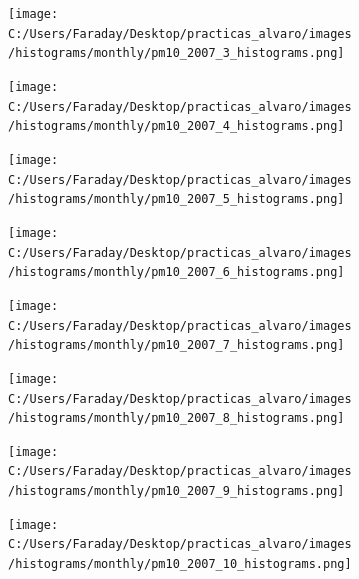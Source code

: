 \documentclass[12pt]{article}
\begin{document}
\begin{figure}[H]
\centering
\begin{subfigure}[h]{0.45\textwidth}
\texttt{[image: C:/Users/Faraday/Desktop/practicas\_alvaro/images/histograms/monthly/pm10\_2007\_3\_histograms.png]}
\caption{}
\label{fig:hist-mon-3-3-2007}
\end{subfigure}
%
\begin{subfigure}[H]{0.45\textwidth}
\texttt{[image: C:/Users/Faraday/Desktop/practicas\_alvaro/images/histograms/monthly/pm10\_2007\_4\_histograms.png]}
\caption{}
\label{fig:hist-mon-3-4-2007}
\end{subfigure}
\caption{}
\end{figure}

\begin{figure}[H]
\centering
\begin{subfigure}[h]{0.45\textwidth}
\texttt{[image: C:/Users/Faraday/Desktop/practicas\_alvaro/images/histograms/monthly/pm10\_2007\_5\_histograms.png]}
\caption{}
\label{fig:hist-mon-3-5-2007}
\end{subfigure}
%
\begin{subfigure}[H]{0.45\textwidth}
\texttt{[image: C:/Users/Faraday/Desktop/practicas\_alvaro/images/histograms/monthly/pm10\_2007\_6\_histograms.png]}
\caption{}
\label{fig:hist-mon-3-6-2007}
\end{subfigure}
\caption{}
\end{figure}

\newpage

\begin{figure}[H]
\centering
\begin{subfigure}[h]{0.45\textwidth}
\texttt{[image: C:/Users/Faraday/Desktop/practicas\_alvaro/images/histograms/monthly/pm10\_2007\_7\_histograms.png]}
\caption{}
\label{fig:hist-mon-3-7-2007}
\end{subfigure}
%
\begin{subfigure}[H]{0.45\textwidth}
\texttt{[image: C:/Users/Faraday/Desktop/practicas\_alvaro/images/histograms/monthly/pm10\_2007\_8\_histograms.png]}
\caption{}
\label{fig:hist-mon-3-8-2007}
\end{subfigure}
\caption{}
\end{figure}

\begin{figure}[H]
\centering
\begin{subfigure}[h]{0.45\textwidth}
\texttt{[image: C:/Users/Faraday/Desktop/practicas\_alvaro/images/histograms/monthly/pm10\_2007\_9\_histograms.png]}
\caption{}
\label{fig:hist-mon-3-9-2007}
\end{subfigure}
%
\begin{subfigure}[H]{0.45\textwidth}
\texttt{[image: C:/Users/Faraday/Desktop/practicas\_alvaro/images/histograms/monthly/pm10\_2007\_10\_histograms.png]}
\caption{}
\label{fig:hist-mon-3-10-2007}
\end{subfigure}
\caption{}
\end{figure}
\end{document}
